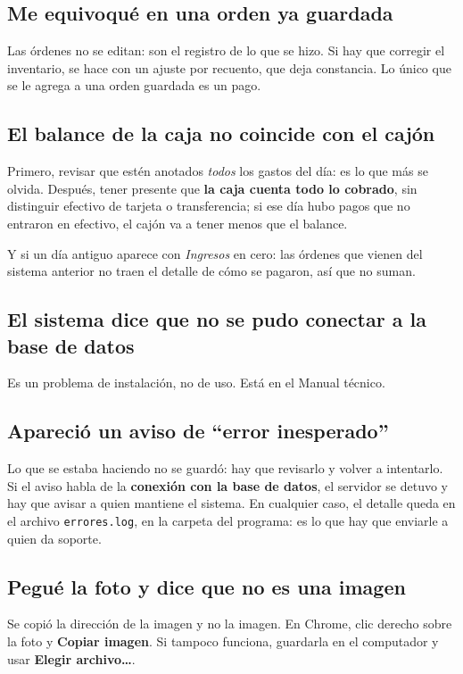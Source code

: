 \documentclass[11pt,a4paper]{article}
\begin{document}
\subsection*{Me equivoqué en una orden ya guardada}
Las órdenes no se editan: son el registro de lo que se hizo. Si hay que corregir
el inventario, se hace con un ajuste por recuento, que deja constancia. Lo único
que se le agrega a una orden guardada es un pago.

\subsection*{El balance de la caja no coincide con el cajón}

Primero, revisar que estén anotados \emph{todos} los gastos del día: es lo que
más se olvida. Después, tener presente que \textbf{la caja cuenta todo lo
cobrado}, sin distinguir efectivo de tarjeta o transferencia; si ese día hubo
pagos que no entraron en efectivo, el cajón va a tener menos que el balance.

Y si un día antiguo aparece con \emph{Ingresos} en cero: las órdenes que vienen
del sistema anterior no traen el detalle de cómo se pagaron, así que no suman.

\subsection*{El sistema dice que no se pudo conectar a la base de datos}
Es un problema de instalación, no de uso. Está en el Manual técnico.

\subsection*{Apareció un aviso de ``error inesperado''}
Lo que se estaba haciendo no se guardó: hay que revisarlo y volver a
intentarlo. Si el aviso habla de la \textbf{conexión con la base de datos}, el
servidor se detuvo y hay que avisar a quien mantiene el sistema. En cualquier
caso, el detalle queda en el archivo \texttt{errores.log}, en la carpeta del
programa: es lo que hay que enviarle a quien da soporte.

\subsection*{Pegué la foto y dice que no es una imagen}
Se copió la dirección de la imagen y no la imagen. En Chrome, clic derecho sobre
la foto y \textbf{Copiar imagen}. Si tampoco funciona, guardarla en el
computador y usar \textbf{Elegir archivo\ldots}.
\end{document}
